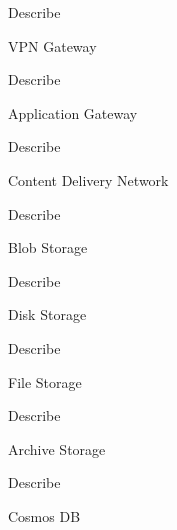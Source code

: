\documentclass{scrartcl}
\newenvironment{flashcard}[2][]{%
    #1
    \vfill
    \centerline{\Large{#2}}
    \vfill
    \newpage
}
{\newpage}
\begin{document}
    \begin{flashcard}[Describe]{VPN Gateway}

    \end{flashcard}

    \begin{flashcard}[Describe]{Application Gateway}

    \end{flashcard}

    \begin{flashcard}[Describe]{Content Delivery Network}

    \end{flashcard}

    \begin{flashcard}[Describe]{Blob Storage}

    \end{flashcard}

    \begin{flashcard}[Describe]{Disk Storage}

    \end{flashcard}

    \begin{flashcard}[Describe]{File Storage}

    \end{flashcard}

    \begin{flashcard}[Describe]{Archive Storage}

    \end{flashcard}

    \begin{flashcard}[Describe]{Cosmos DB}

    \end{flashcard}
\end{document}

